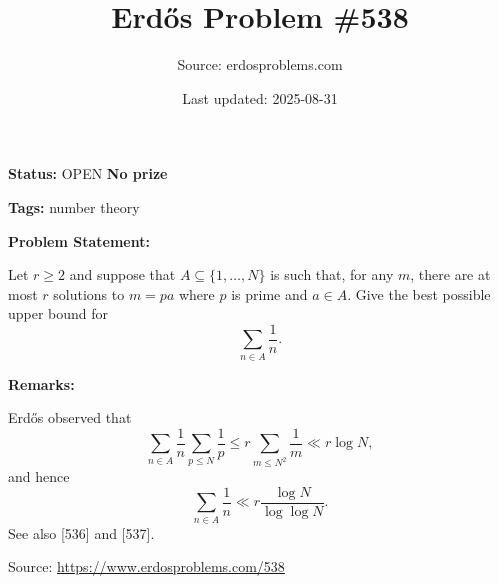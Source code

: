 \documentclass{article}
\title{Erd\H{o}s Problem \#538}
\date{Last updated: 2025-08-31}
\author{Source: erdosproblems.com}
\begin{document}
\maketitle

\noindent\textbf{Status:} OPEN \quad \textbf{No prize}

\noindent\textbf{Tags:} number theory

\medskip
\noindent\textbf{Problem Statement:}

Let $r\geq 2$ and suppose that $A\subseteq\{1,\ldots,N\}$ is such that, for any $m$, there are at most $r$ solutions to $m=pa$ where $p$ is prime and $a\in A$. Give the best possible upper bound for\[\sum_{n\in A}\frac{1}{n}.\]

\bigskip
\noindent\textbf{Remarks:}

Erd\H{o}s observed that\[\sum_{n\in A}\frac{1}{n}\sum_{p\leq N}\frac{1}{p}\leq r\sum_{m\leq N^2}\frac{1}{m}\ll r\log N,\]and hence\[\sum_{n\in A}\frac{1}{n} \ll r\frac{\log N}{\log\log N}.\]See also [536] and [537].

\bigskip
\noindent\small{Source: \url{https://www.erdosproblems.com/538}}
\end{document}

